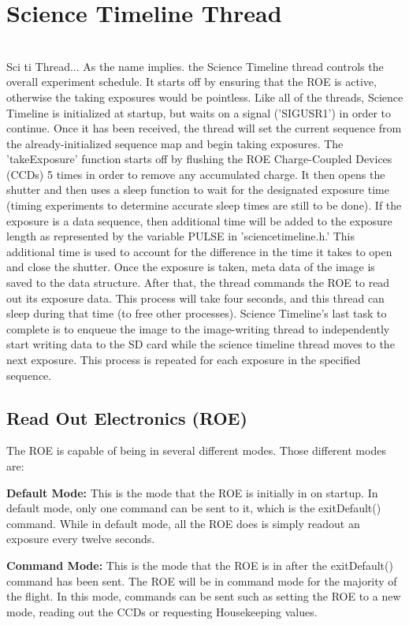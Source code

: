 %
\section{Science Timeline Thread}
\hrulefill
\\
Sci ti Thread...
As the name implies. the Science Timeline thread controls the overall experiment schedule. It starts off by ensuring that the ROE is active, otherwise the taking exposures would be pointless. Like all of the threads, Science Timeline is initialized at startup, but waits on a signal ('SIGUSR1') in order to continue. Once it has been received, the thread will set the current sequence from the already-initialized sequence map and begin taking exposures. The 'takeExposure' function starts off by flushing the ROE Charge-Coupled Devices (CCDs) 5 times in order to remove any accumulated charge. It then opens the shutter and then uses a sleep function to wait for the designated exposure time (timing experiments to determine accurate sleep times are still to be done). If the exposure is a data sequence, then additional time will be added to the exposure length as represented by the variable PULSE in 'sciencetimeline.h.' This additional time is used to account for the difference in the time it takes to open and close the shutter. 
Once the exposure is taken, meta data of the image is saved to the data structure. After that, the thread commands the ROE to read out its exposure data. This process will take four seconds, and this thread can sleep during that time (to free other processes). Science Timeline's last task to complete is to enqueue the image to the image-writing thread to independently start writing data to the SD card while the science timeline thread moves to the next exposure. 
This process is repeated for each exposure in the specified sequence.

\subsection{Read Out Electronics (ROE)}

The ROE is capable of being in several different modes. Those different modes are:

\textbf{Default Mode:}
This is the mode that the ROE is initially in on startup. In default mode, only one command can be sent to it, which is the exitDefault() command. While in default mode, all the ROE does is simply readout an exposure every twelve seconds.

\textbf{Command Mode:}
This is the mode that the ROE is in after the exitDefault() command has been sent. The ROE will be in command mode for the majority of the flight. In this mode, commands can be sent such as setting the ROE to a new mode, reading out the CCDs or requesting Housekeeping values. 

